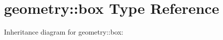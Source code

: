 \hypertarget{structgeometry_1_1box}{}\section{geometry\+:\+:box Type Reference}
\label{structgeometry_1_1box}


Inheritance diagram for geometry\+:\+:box\+:

